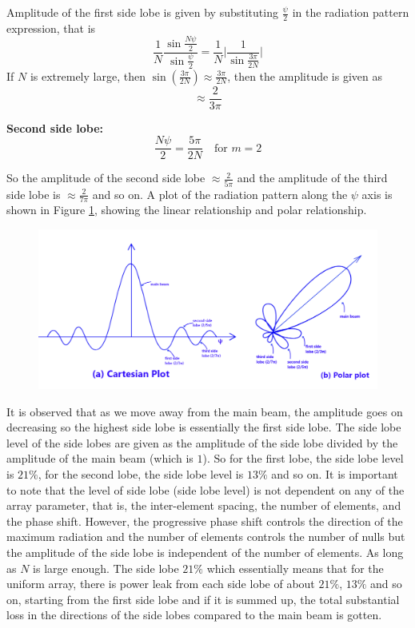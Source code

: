 Amplitude of the first side lobe is given by substituting $\frac{\psi}{2}$ in the radiation pattern expression, that is
$$\frac{1}{N} \frac{\sin{\frac{N\psi}{2}}}{\sin{\frac{\psi}{2}}} = \frac{1}{N} |{\frac{1}{\sin{\frac{3\pi}{2N}}} |}   $$
If $N$ is extremely large, then $\sin{(\frac{3\pi}{2N})} \approx  \frac{3\pi}{2N}$, then the amplitude is given as $$\approx \frac{2}{3\pi}$$


\textbf{Second side lobe:}
$$\frac{N\psi}{2} = \frac{5\pi}{2N} \quad \text{for $m=2$} $$

So the amplitude of the second side lobe  $\approx \frac{2}{5\pi}$ and the amplitude of the third side lobe is $\approx \frac{2}{7\pi}$ and so on. A plot of the radiation pattern along the $\psi$ axis is shown in Figure \ref{53.4}, showing the linear relationship and polar relationship.
\begin{figure}[h]
\centering
\includegraphics[width=1\linewidth]{./graphics/fig53_4}
\caption{}
\label{53.4}
\end{figure}

It is observed that as we move away from the main beam,  the amplitude goes on decreasing so the highest side lobe is essentially the first side lobe. The side lobe level of the side lobes are given as the amplitude of the side lobe divided by the amplitude of the main beam (which is $1$). So for the first lobe, the side lobe level is $21\%$, for the second lobe, the side lobe level is $13\%$ and so on. It is important to note that the level of side lobe (side lobe level) is not dependent on any of the array parameter, that is, the inter-element spacing, the number of elements, and the phase shift. However, the progressive phase shift controls the direction of the maximum radiation and the number of elements controls the number of nulls but the amplitude of the side lobe is independent of the number of elements. As long as $N$ is large enough. The side lobe $21\%$ which essentially means that for the uniform array, there is power leak  from each side lobe of about $21\%$, $13\%$ and so on, starting from the first side lobe and if it is summed up, the total substantial loss in the directions of the side lobes compared to the main beam is gotten.